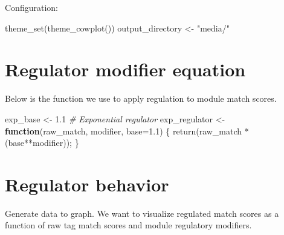 \documentclass[
]{book}
\newenvironment{Shaded}{\begin{snugshade}}{\end{snugshade}}
\newcommand{\AttributeTok}[1]{\textcolor[rgb]{0.77,0.63,0.00}{#1}}
\newcommand{\CommentTok}[1]{\textcolor[rgb]{0.56,0.35,0.01}{\textit{#1}}}
\newcommand{\ControlFlowTok}[1]{\textcolor[rgb]{0.13,0.29,0.53}{\textbf{#1}}}
\newcommand{\FloatTok}[1]{\textcolor[rgb]{0.00,0.00,0.81}{#1}}
\newcommand{\FunctionTok}[1]{\textcolor[rgb]{0.00,0.00,0.00}{#1}}
\newcommand{\NormalTok}[1]{#1}
\newcommand{\OtherTok}[1]{\textcolor[rgb]{0.56,0.35,0.01}{#1}}
\newcommand{\SpecialCharTok}[1]{\textcolor[rgb]{0.00,0.00,0.00}{#1}}
\newcommand{\StringTok}[1]{\textcolor[rgb]{0.31,0.60,0.02}{#1}}
\begin{document}
Configuration:

\begin{Shaded}
\begin{Highlighting}[]
\FunctionTok{theme\_set}\NormalTok{(}\FunctionTok{theme\_cowplot}\NormalTok{())}
\NormalTok{output\_directory }\OtherTok{\textless{}{-}} \StringTok{"media/"}
\end{Highlighting}
\end{Shaded}

\hypertarget{regulator-modifier-equation}{%
\section{Regulator modifier equation}\label{regulator-modifier-equation}}

Below is the function we use to apply regulation to module match scores.

\begin{Shaded}
\begin{Highlighting}[]
\NormalTok{exp\_base }\OtherTok{\textless{}{-}} \FloatTok{1.1}
\CommentTok{\# Exponential regulator}
\NormalTok{exp\_regulator }\OtherTok{\textless{}{-}} \ControlFlowTok{function}\NormalTok{(raw\_match, modifier, }\AttributeTok{base=}\FloatTok{1.1}\NormalTok{) \{}
  \FunctionTok{return}\NormalTok{(raw\_match }\SpecialCharTok{*}\NormalTok{ (base}\SpecialCharTok{**}\NormalTok{modifier));}
\NormalTok{\}}
\end{Highlighting}
\end{Shaded}

\hypertarget{regulator-behavior}{%
\section{Regulator behavior}\label{regulator-behavior}}

Generate data to graph. We want to visualize regulated match scores as a function of raw tag match scores and module regulatory modifiers.
\end{document}
